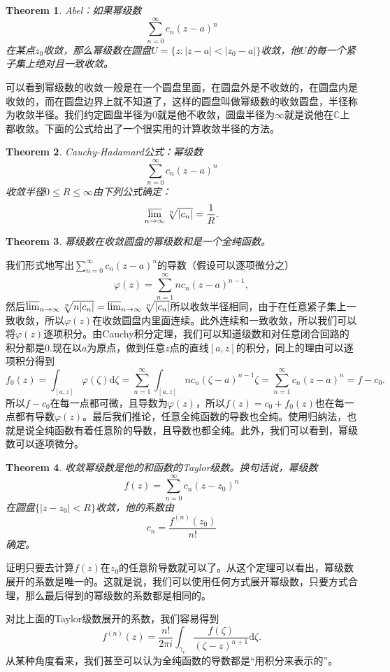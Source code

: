 \documentclass[10pt]{book}
\theoremstyle{plain}%
\newtheorem{theo}{Theorem}[chapter]%
\begin{document}
\begin{theo}
	Abel：如果幂级数
	\[ \sum_{n=0}^\infty c_n (z-a)^n\]
	在某点$z_0$收敛，那么幂级数在圆盘$U=\{z:|z-a|<|z_0-a|\}$收敛，他$U$的每一个紧子集上绝对且一致收敛。 
\end{theo}
可以看到幂级数的收敛一般是在一个圆盘里面，在圆盘外是不收敛的，在圆盘内是收敛的，而在圆盘边界上就不知道了，这样的圆盘叫做幂级数的收敛圆盘，半径称为收敛半径。我们约定圆盘半径为0就是他不收敛，圆盘半径为$\infty$就是说他在$\mathbb{C}$上都收敛。下面的公式给出了一个很实用的计算收敛半径的方法。
\begin{theo}
	Cauchy-Hadamard公式：幂级数
	\[ \sum_{n=0}^\infty c_n (z-a)^n\]
收敛半径$0\leq R \leq \infty$由下列公式确定：\[\varlimsup_{n\to \infty} \sqrt[n]{|c_n|}=\frac{1}{R}.\]
\end{theo}
\begin{theo}
	幂级数在收敛圆盘的幂级数和是一个全纯函数。
\end{theo}
我们形式地写出$\sum_{n=0}^\infty c_n (z-a)^n$的导数（假设可以逐项微分之）\[\varphi(z)=\sum_{n=1}^\infty nc_n (z-a)^{n-1},\]然后$\varlimsup_{n\to \infty} \sqrt[n]{n|c_n|}=\varlimsup_{n\to \infty} \sqrt[n]{|c_n|}$所以收敛半径相同，由于在任意紧子集上一致收敛，所以$\varphi(z)$在收敛圆盘内里面连续。此外连续和一致收敛，所以我们可以将$\varphi(z)$逐项积分。由Cauchy积分定理，我们可以知道级数和对任意闭合回路的积分都是0.现在以$a$为原点，做到任意$z$点的直线$[a,z]$的积分，同上的理由可以逐项积分得到
\[
f_0(z)=\int_{[a,z]}\varphi(\zeta)\mathrm{d}\zeta=\sum_{n=1}^\infty\int_{[a,z]} nc_n (\zeta-a)^{n-1}\zeta=\sum_{n=1}^\infty c_n (z-a)^n=f-c_0.
\]
所以$f-c_0$在每一点都可微，且导数为$\varphi(z)$，所以$f(z)=c_0+f_0(z)$也在每一点都有导数$\varphi(z)$。最后我们推论，任意全纯函数的导数也全纯。使用归纳法，也就是说全纯函数有着任意阶的导数，且导数也都全纯。此外，我们可以看到，幂级数可以逐项微分。
\begin{theo}
	收敛幂级数是他的和函数的Taylor级数。换句话说，幂级数\[f(z)=\sum_{n=0}^\infty c_n (z-z_0)^n\]在圆盘$\{|z-z_0|<R\}$收敛，他的系数由
	\[
		c_n=\frac{f^{(n)}(z_0)}{n!}
	\]
	确定。
\end{theo}
证明只要去计算$f(z)$在$z_0$的任意阶导数就可以了。从这个定理可以看出，幂级数展开的系数是唯一的。这就是说，我们可以使用任何方式展开幂级数，只要方式合理，那么最后得到的幂级数的系数都是相同的。

对比上面的Taylor级数展开的系数，我们容易得到\[f^{(n)}(z)=\frac{n!}{2\pi i}\int_{\gamma_r}\frac{f(\zeta)}{(\zeta -z)^{n+1}}\mathrm{d}\zeta.\]从某种角度看来，我们甚至可以认为全纯函数的导数都是“用积分来表示的”。
\end{document}
